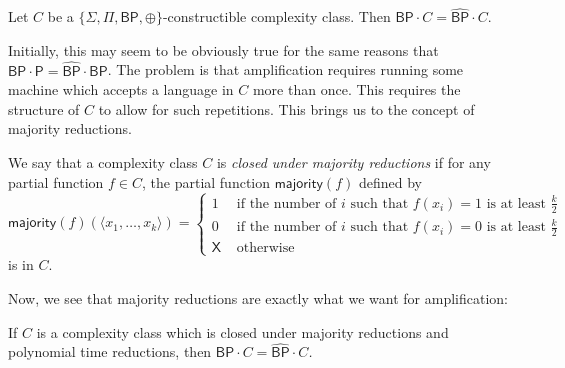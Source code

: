 \documentclass[11pt]{article}
\newcommand{\bp}{\textsf{BP}}
\newcommand{\strongbp}{\widehat{\textsf{BP}}}
\newcommand{\parity}{\oplus}
\newcommand{\p}{\textsf{P}}
\newcommand{\x}{\textsf{X}}
\newcommand{\majority}{\textsf{majority}}
\begin{document}
\begin{theorem}\label{amplify}
Let $C$ be a \emph{$\{\Sigma,\Pi,\bp,\parity\}$}-constructible complexity class. Then \emph{$\bp \cdot C = \strongbp \cdot C$}.
\end{theorem}
Initially, this may seem to be obviously true for the same reasons that $\bp \cdot \p = \strongbp \cdot \bp$. The problem is that amplification requires running some machine which accepts a language in $C$ more than once. This requires the structure of $C$ to allow for such repetitions. This brings us to the concept of majority reductions.
\begin{definition}\label{defmajority}
We say that a complexity class $C$ is \emph{closed under majority reductions} if for any partial function $f \in C$, the partial function $\majority(f)$ defined by
$$\majority(f)(\langle x_1, \ldots, x_k\rangle) = 
\begin{cases}1 & \text{ if the number of $i$ such that }f(x_i) = 1\text{ is at least $\frac{k}{2}$} \\
0 & \text{ if the number of $i$ such that }f(x_i) = 0\text{ is at least $\frac{k}{2}$}\\
\x & \text{ otherwise}
\end{cases}$$
is in $C$.
\end{definition}
Now, we see that majority reductions are exactly what we want for amplification:
\begin{lemma}\label{majorityimpliesamplify}
If $C$ is a complexity class which is closed under majority reductions and polynomial time reductions, then \emph{$\bp \cdot C = \strongbp \cdot C$.}
\end{lemma}
\end{document}
